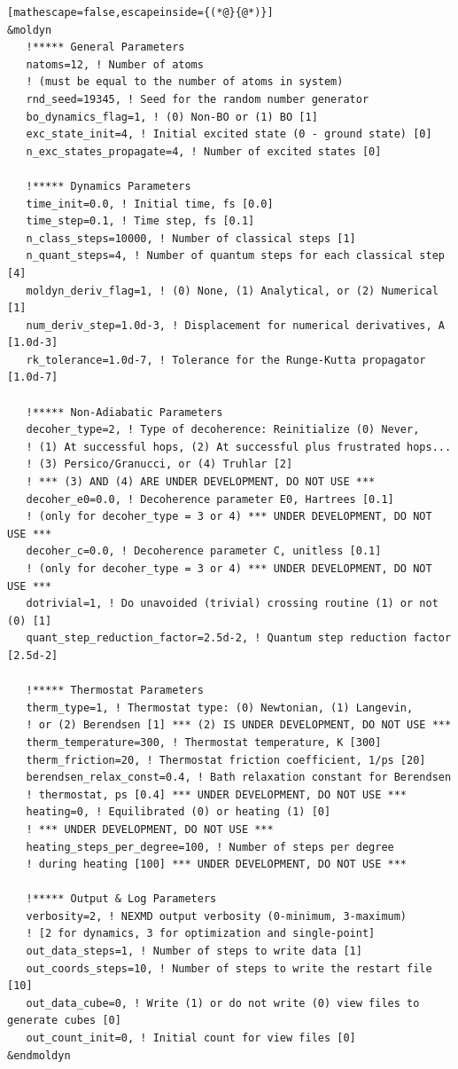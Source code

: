 \documentclass[letterpaper,12pt,titlepage]{article}
\begin{document}
\begin{appendix}
\begin{lstlisting}[mathescape=false,escapeinside={(*@}{@*)}]
&moldyn
   !***** General Parameters
   natoms=12, ! Number of atoms 
   ! (must be equal to the number of atoms in system)
   rnd_seed=19345, ! Seed for the random number generator
   bo_dynamics_flag=1, ! (0) Non-BO or (1) BO [1]
   exc_state_init=4, ! Initial excited state (0 - ground state) [0]
   n_exc_states_propagate=4, ! Number of excited states [0]

   !***** Dynamics Parameters
   time_init=0.0, ! Initial time, fs [0.0]
   time_step=0.1, ! Time step, fs [0.1]
   n_class_steps=10000, ! Number of classical steps [1]
   n_quant_steps=4, ! Number of quantum steps for each classical step [4]
   moldyn_deriv_flag=1, ! (0) None, (1) Analytical, or (2) Numerical [1]
   num_deriv_step=1.0d-3, ! Displacement for numerical derivatives, A [1.0d-3]
   rk_tolerance=1.0d-7, ! Tolerance for the Runge-Kutta propagator [1.0d-7]

   !***** Non-Adiabatic Parameters
   decoher_type=2, ! Type of decoherence: Reinitialize (0) Never, 
   ! (1) At successful hops, (2) At successful plus frustrated hops... 
   ! (3) Persico/Granucci, or (4) Truhlar [2]
   ! *** (3) AND (4) ARE UNDER DEVELOPMENT, DO NOT USE ***
   decoher_e0=0.0, ! Decoherence parameter E0, Hartrees [0.1]
   ! (only for decoher_type = 3 or 4) *** UNDER DEVELOPMENT, DO NOT USE ***
   decoher_c=0.0, ! Decoherence parameter C, unitless [0.1]
   ! (only for decoher_type = 3 or 4) *** UNDER DEVELOPMENT, DO NOT USE ***
   dotrivial=1, ! Do unavoided (trivial) crossing routine (1) or not (0) [1]
   quant_step_reduction_factor=2.5d-2, ! Quantum step reduction factor [2.5d-2]

   !***** Thermostat Parameters
   therm_type=1, ! Thermostat type: (0) Newtonian, (1) Langevin, 
   ! or (2) Berendsen [1] *** (2) IS UNDER DEVELOPMENT, DO NOT USE ***
   therm_temperature=300, ! Thermostat temperature, K [300]
   therm_friction=20, ! Thermostat friction coefficient, 1/ps [20]
   berendsen_relax_const=0.4, ! Bath relaxation constant for Berendsen 
   ! thermostat, ps [0.4] *** UNDER DEVELOPMENT, DO NOT USE ***
   heating=0, ! Equilibrated (0) or heating (1) [0]
   ! *** UNDER DEVELOPMENT, DO NOT USE ***
   heating_steps_per_degree=100, ! Number of steps per degree
   ! during heating [100] *** UNDER DEVELOPMENT, DO NOT USE ***

   !***** Output & Log Parameters
   verbosity=2, ! NEXMD output verbosity (0-minimum, 3-maximum)
   ! [2 for dynamics, 3 for optimization and single-point]
   out_data_steps=1, ! Number of steps to write data [1]
   out_coords_steps=10, ! Number of steps to write the restart file [10]
   out_data_cube=0, ! Write (1) or do not write (0) view files to generate cubes [0]
   out_count_init=0, ! Initial count for view files [0]
&endmoldyn


\end{lstlisting}
\end{appendix}
\end{document}
